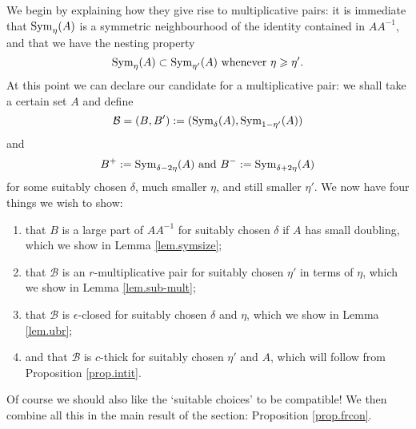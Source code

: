 \documentclass[12pt]{amsart}
\numberwithin{equation}{section}
\theoremstyle{plain}
\theoremstyle{definition}
\renewcommand{\geq}{\geqslant}
\providecommand{\Sym}{\mathop{\rm Sym}\nolimits}
\begin{document}
We begin by explaining how they give rise to multiplicative pairs: it is immediate that $\Sym_\eta(A)$ is a symmetric neighbourhood of the identity contained in $AA^{-1}$, and that we have the nesting property
\begin{equation*}
\Sym_\eta(A) \subset \Sym_{\eta'}(A) \textrm{ whenever } \eta \geq \eta'.
\end{equation*}
At this point we can declare our candidate for a multiplicative pair: we shall take a certain set $A$ and define
\begin{equation*}
\mathcal{B}=(B,B'):=(\Sym_\delta(A),\Sym_{1-\eta'}(A))
\end{equation*}
and
\begin{equation*}
B^+:= \Sym_{\delta-2\eta}(A) \textrm{ and } B^-:=\Sym_{\delta + 2\eta}(A)
\end{equation*}
for some suitably chosen $\delta$, much smaller $\eta$, and still smaller $\eta'$.  We now have four things we wish to show:
\begin{enumerate}
\item that $B$ is a large part of $AA^{-1}$ for suitably chosen $\delta$ if $A$ has small doubling, which we show in Lemma \ref{lem.symsize};
\item that $\mathcal{B}$ is an $r$-multiplicative pair for suitably chosen $\eta'$ in terms of $\eta$, which we show in Lemma \ref{lem.sub-mult};
\item that $\mathcal{B}$ is $\epsilon$-closed for suitably chosen $\delta$ and $\eta$, which we show in Lemma \ref{lem.ubr};
\item and that $\mathcal{B}$ is $c$-thick for suitably chosen $\eta'$ and $A$, which will follow from Proposition \ref{prop.intit}.
\end{enumerate}
Of course we should also like the `suitable choices' to be compatible!  We then combine all this in the main result of the section: Proposition \ref{prop.frcon}.
\end{document}
